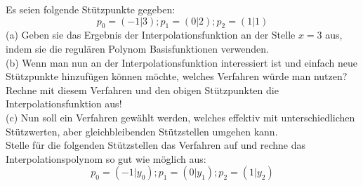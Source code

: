 \documentclass{scrartcl}
\begin{document}
	Es seien folgende Stützpunkte gegeben:
	$$p_0 = (-1 | 3); p_1 = (0 | 2); p_2 = (1 | 1)$$
	\n
	(a)
	Geben sie das Ergebnis der Interpolationsfunktion an der Stelle $x = 3$ aus, indem sie die regulären Polynom Basisfunktionen verwenden.
	\\
	(b)
	Wenn man nun an der Interpolationsfunktion interessiert ist und einfach neue Stützpunkte hinzufügen können möchte, welches Verfahren würde man nutzen? \\
	Rechne mit diesem Verfahren und den obigen Stützpunkten die Interpolationsfunktion aus!
	\\
	(c)
	Nun soll ein Verfahren gewählt werden, welches effektiv mit unterschiedlichen Stützwerten, aber gleichbleibenden Stützstellen umgehen kann.\\
	Stelle für die folgenden Stützstellen das Verfahren auf und rechne das Interpolationspolynom so gut wie möglich aus:
	$$p_0 = (-1 | y_0); p_1 = (0 | y_1); p_2 = (1 | y_2)$$
	
\end{document}
